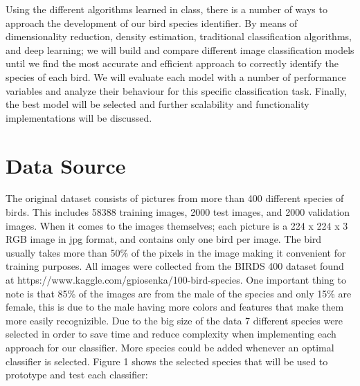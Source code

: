 \documentclass[11pt]{article}
\begin{document}
\begin{singlespace}
Using the different algorithms learned in class, there is a number of ways to approach the development of our bird species identifier. By means of dimensionality reduction, density estimation, traditional classification algorithms, and deep learning; we will build and compare different image classification models until we find the most accurate and efficient approach to correctly identify the species of each bird. We will evaluate each model with a number of performance variables and analyze their behaviour for this specific classification task. Finally, the best model will be selected and further scalability and functionality implementations will be discussed. \\

\section{Data Source}

The original dataset consists of pictures from more than 400 different species of birds. This includes 58388 training images, 2000 test images, and 2000 validation images. When it comes to the images themselves; each picture is a 224 x 224 x 3 RGB image in jpg format, and contains only one bird per image. The bird usually takes more than 50\% of the pixels in the image making it convenient for training purposes. All images were collected from the BIRDS 400 dataset found at https://www.kaggle.com/gpiosenka/100-bird-species. One important thing to note is that 85\% of the images are from the male of the species and only 15\% are female, this is due to the male having more colors and features that make them more easily recognizible. Due to the big size of the data 7 different species were selected in order to save time and reduce complexity when implementing each approach for our classifier. More species could be added whenever an optimal classifier is selected. Figure 1 shows the selected species that will be used to prototype and test each classifier:\\

\begin{figure}[h]
    \centering
    
    \\
    

\end{figure}
\end{singlespace}
\end{document}
